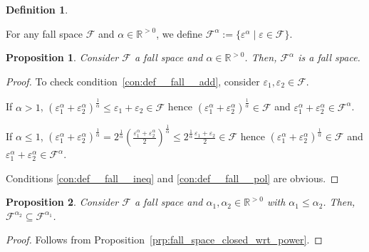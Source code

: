 \documentclass[11pt]{article}
\numberwithin{equation}{section}
\theoremstyle{definition}
\newtheorem{definition}{Definition}[section]
\theoremstyle{plain}
\newtheorem{proposition}{Proposition}[section]
\newcommand{\Reals}{\mathbb{R}}
\newcommand{\Fall}{\mathcal{F}}
\begin{document}
\begin{samepage}
\begin{definition}
\label{def:fall_space_power}

For any fall space $\Fall$ and $\alpha \in \Reals^{>0}$, we define ${\Fall^\alpha := \{\varepsilon^\alpha \mid \varepsilon \in \Fall\}}$.

\end{definition}
\end{samepage}

\begin{proposition}

Consider $\Fall$ a fall space and $\alpha \in \Reals^{>0}$. Then, $\Fall^\alpha$ is a fall space.

\end{proposition}

\begin{proof}

To check condition~\ref{con:def__fall__add}, consider $\varepsilon_1, \varepsilon_2 \in \Fall$. 

If $\alpha > 1$, $(\varepsilon_1^\alpha + \varepsilon_2^\alpha)^\frac{1}{\alpha} \leq \varepsilon_1 + \varepsilon_2 \in \Fall$ hence $(\varepsilon_1^\alpha + \varepsilon_2^\alpha)^\frac{1}{\alpha} \in \Fall$ and $\varepsilon_1^\alpha + \varepsilon_2^\alpha \in \Fall^\alpha$.

If $\alpha \leq 1$, $(\varepsilon_1^\alpha + \varepsilon_2^\alpha)^\frac{1}{\alpha} = 2^\frac{1}{\alpha}(\frac{\varepsilon_1^\alpha + \varepsilon_2^\alpha}{2})^\frac{1}{\alpha} \leq 2^\frac{1}{\alpha} \frac{\varepsilon_1+\varepsilon_2}{2} \in \Fall$ hence $(\varepsilon_1^\alpha + \varepsilon_2^\alpha)^\frac{1}{\alpha} \in \Fall$ and $\varepsilon_1^\alpha + \varepsilon_2^\alpha \in \Fall^\alpha$.

Conditions \ref{con:def__fall__ineq} and \ref{con:def__fall__pol} are obvious.
\end{proof}

\begin{proposition}

Consider $\Fall$ a fall space and $\alpha_1,\alpha_2 \in \Reals^{>0}$ with $\alpha_1 \leq \alpha_2$. Then, ${\Fall^{\alpha_2} \subseteq \Fall^{\alpha_1}}$.

\end{proposition}

\begin{proof}

Follows from Proposition~\ref{prp:fall_space_closed_wrt_power}.
\end{proof}
\end{document}
